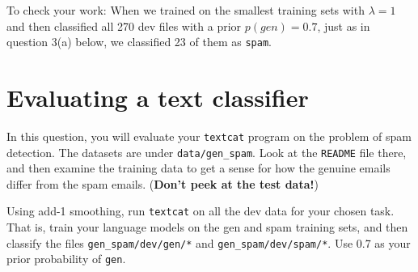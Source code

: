 \documentclass[12pt]{article}
\theoremstyle{plain}
\theoremstyle{definition}
\theoremstyle{remark}
\begin{document}
To check your work: When we trained on the smallest training sets with $\lambda=1$ and then classified all 270 dev files with a prior $p(gen)=0.7$, just as in question 3(a) below, we classified 23 of them as \texttt{spam}.
 
\newpage
\section{Evaluating a text classifier}

In this question, you will evaluate your \texttt{textcat} program on the problem of spam detection. The datasets are under \texttt{data/gen\_spam}. Look at the \texttt{README} file there, and then examine the training data to get a sense for how the genuine emails differ from the spam emails. (\textbf{Don’t peek at the test data!})

Using add-1 smoothing, run \texttt{textcat} on all the dev data for your chosen task. That is, train your language models on the gen and spam training sets, and then classify the files \texttt{gen\_spam/dev/gen/*} and \texttt{gen\_spam/dev/spam/*}. Use 0.7 as your prior probability of \texttt{gen}.
\end{document}
